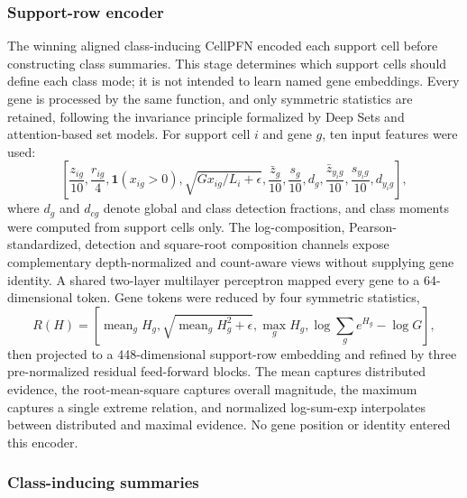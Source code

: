 \documentclass[12pt]{article}
\begin{document}
\subsubsection*{Support-row encoder}

The winning aligned class-inducing CellPFN encoded each support cell before constructing class summaries. This stage determines which support cells should define each class mode; it is not intended to learn named gene embeddings. Every gene is processed by the same function, and only symmetric statistics are retained, following the invariance principle formalized by Deep Sets and attention-based set models\cite{zaheer2017deepsets,lee2019settransformer}. For support cell $i$ and gene $g$, ten input features were used:
\begin{equation}
\left[
\frac{z_{ig}}{10},\frac{r_{ig}}{4},\mathbf{1}(x_{ig}>0),\sqrt{Gx_{ig}/L_i+\epsilon},
\frac{\bar z_g}{10},\frac{s_g}{10},d_g,
\frac{\bar z_{y_i g}}{10},\frac{s_{y_i g}}{10},d_{y_i g}
\right],
\end{equation}
where $d_g$ and $d_{cg}$ denote global and class detection fractions, and class moments were computed from support cells only. The log-composition, Pearson-standardized, detection and square-root composition channels expose complementary depth-normalized and count-aware views without supplying gene identity\cite{hafemeister2019sctransform,townes2019multinomial,lause2021pearson}. A shared two-layer multilayer perceptron mapped every gene to a 64-dimensional token. Gene tokens were reduced by four symmetric statistics,
\begin{equation}
R(H)=\left[\operatorname{mean}_gH_g,\sqrt{\operatorname{mean}_gH_g^2+\epsilon},\max_gH_g,\log\sum_g e^{H_g}-\log G\right],
\end{equation}
then projected to a 448-dimensional support-row embedding and refined by three pre-normalized residual feed-forward blocks. The mean captures distributed evidence, the root-mean-square captures overall magnitude, the maximum captures a single extreme relation, and normalized log-sum-exp interpolates between distributed and maximal evidence. No gene position or identity entered this encoder.

\subsubsection*{Class-inducing summaries}
\end{document}
